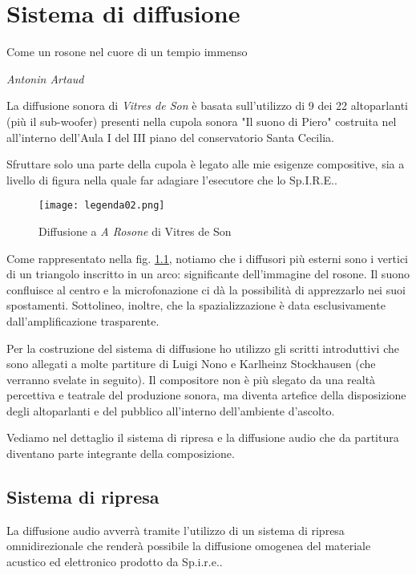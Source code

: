 
\chapter{Sistema di diffusione}
\label{chp:Sistema di diffusione}

\epigraph{Come un rosone nel cuore di un tempio immenso}{\textit{Antonin Artaud}}

La diffusione sonora di \emph{Vitres de Son} è basata sull'utilizzo di 9 dei 22 altoparlanti (più il sub-woofer) presenti nella cupola sonora "Il suono di Piero" costruita nel all'interno dell'Aula I del III piano del conservatorio Santa Cecilia.

Sfruttare solo una parte della cupola è legato alle mie esigenze compositive, sia a livello di figura nella quale far adagiare l'esecutore che lo Sp.I.R.E..

\begin{figure}[htbp]
\begin{center}
\texttt{[image: legenda02.png]}
\caption{Diffusione a \textit{A Rosone} di Vitres de Son}
\label{fig:diff}
\end{center}
\end{figure}

Come rappresentato nella fig. \ref{fig:diff}, notiamo che i diffusori più esterni sono i vertici di un triangolo inscritto in un arco: significante dell'immagine del rosone. Il suono confluisce al centro e la microfonazione ci dà la possibilità di apprezzarlo nei suoi spostamenti. Sottolineo, inoltre, che la spazializzazione è data esclusivamente dall'amplificazione trasparente.

Per la costruzione del sistema di diffusione ho utilizzo gli scritti introduttivi che sono allegati a molte partiture di Luigi Nono e Karlheinz Stockhausen (che verranno svelate in seguito). Il compositore non è più slegato da una realtà percettiva e teatrale del produzione sonora, ma diventa artefice della disposizione degli altoparlanti e del pubblico all'interno dell'ambiente d'ascolto.

Vediamo nel dettaglio il sistema di ripresa e la diffusione audio che da partitura diventano parte integrante della composizione.


\section{Sistema di ripresa}
La diffusione audio avverrà tramite l'utilizzo di un sistema di ripresa omnidirezionale che renderà possibile la diffusione omogenea del materiale acustico ed elettronico prodotto da Sp.i.r.e..


